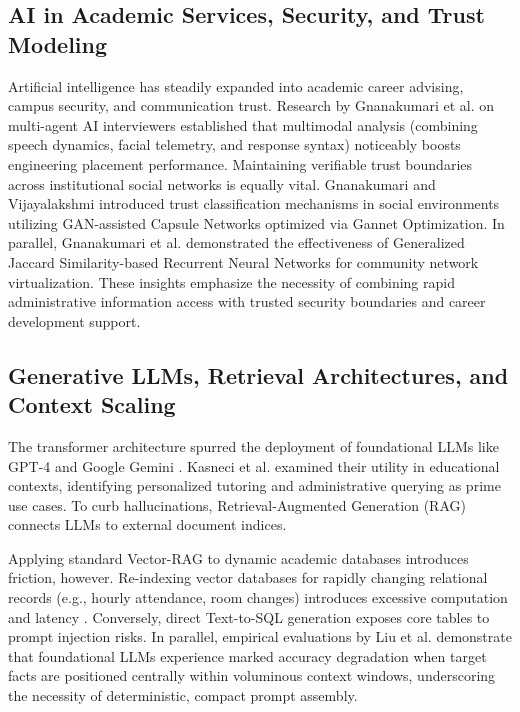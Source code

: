 \documentclass[conference]{IEEEtran}
\begin{document}
\subsection{AI in Academic Services, Security, and Trust Modeling}
Artificial intelligence has steadily expanded into academic career advising, campus security, and communication trust. Research by Gnanakumari et al. \cite{gnanakumari2025multi} on multi-agent AI interviewers established that multimodal analysis (combining speech dynamics, facial telemetry, and response syntax) noticeably boosts engineering placement performance. Maintaining verifiable trust boundaries across institutional social networks is equally vital. Gnanakumari and Vijayalakshmi \cite{gnanakumari2024trust} introduced trust classification mechanisms in social environments utilizing GAN-assisted Capsule Networks optimized via Gannet Optimization. In parallel, Gnanakumari et al. \cite{gnanakumari2023social} demonstrated the effectiveness of Generalized Jaccard Similarity-based Recurrent Neural Networks for community network virtualization. These insights emphasize the necessity of combining rapid administrative information access with trusted security boundaries and career development support.

\subsection{Generative LLMs, Retrieval Architectures, and Context Scaling}
The transformer architecture \cite{vaswani2017attention, devlin2018bert} spurred the deployment of foundational LLMs like GPT-4 \cite{openai2023gpt4} and Google Gemini \cite{geminitechreport2023}. Kasneci et al. \cite{kasneci2023chatgpt} examined their utility in educational contexts, identifying personalized tutoring and administrative querying as prime use cases. To curb hallucinations, Retrieval-Augmented Generation (RAG) \cite{lewis2020retrieval} connects LLMs to external document indices.

Applying standard Vector-RAG to dynamic academic databases introduces friction, however. Re-indexing vector databases for rapidly changing relational records (e.g., hourly attendance, room changes) introduces excessive computation and latency \cite{zhang2024intelligent, alshboul2025dynamic}. Conversely, direct Text-to-SQL generation exposes core tables to prompt injection risks. In parallel, empirical evaluations by Liu et al. \cite{liu2024lost} demonstrate that foundational LLMs experience marked accuracy degradation when target facts are positioned centrally within voluminous context windows, underscoring the necessity of deterministic, compact prompt assembly.
\end{document}
